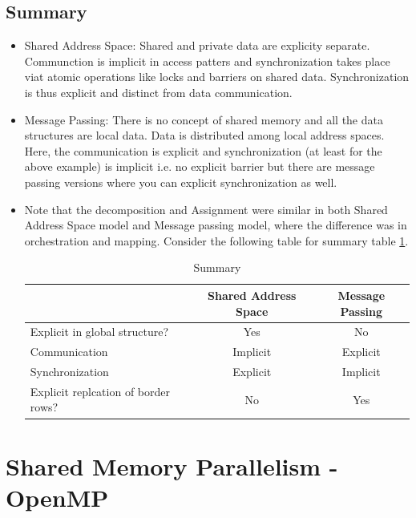 \documentclass[12pt]{article}
\begin{document}
\subsection{Summary}
\begin{itemize}
\item Shared Address Space: Shared and private data are explicity separate. Communction is implicit in access patters and synchronization takes place viat atomic operations like locks and barriers on shared data.
Synchronization is thus explicit and distinct from data communication.
\item Message Passing: There is no concept of shared memory and all the data structures are local data. Data is distributed among local address spaces. 
Here, the communication is explicit and synchronization (at least for the above example) is implicit i.e. no explicit barrier but there are message passing versions where you can explicit synchronization as well.
\item Note that the decomposition and Assignment were similar in both Shared Address Space model and Message passing model, where the difference was in orchestration and mapping. Consider the following table for summary table \ref{tab:finsummary}.
\begin{table}[H]
    \centering
    \begin{tabular}{|p{}|c|c|}
        \hline
        & Shared Address Space & Message Passing \\
        \hline
        Explicit in global structure? & Yes & No\\
        Communication & Implicit & Explicit \\
        Synchronization & Explicit & Implicit \\
        Explicit replcation of border rows? & No & Yes \\
        \hline
    \end{tabular}
    \caption{Summary}
    \label{tab:finsummary}
\end{table}
\end{itemize}

\section{Shared Memory Parallelism - OpenMP}
\end{document}
